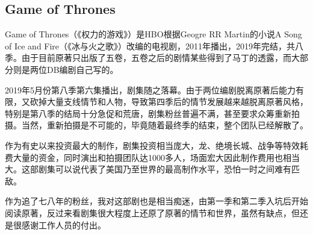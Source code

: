 \subsection{Game of Thrones}
Game of Thrones（《权力的游戏》）是HBO根据Geogre RR Martin的小说A Song of Ice and Fire（《冰与火之歌》）改编的电视剧，2011年播出，2019年完结，共八季。由于目前原著只出版了五卷，五卷之后的剧情某些得到了马丁的透露，而大部分则是两位DB编剧自己写的。

2019年5月份第八季第六集播出，剧集随之落幕。由于两位编剧脱离原著后能力有限，又砍掉大量支线情节和人物，导致第四季后的情节发展越来越脱离原著风格，特别是第八季的结局十分急促和荒唐，剧集粉丝普遍不满，甚至要求众筹重新拍摄。当然，重新拍摄是不可能的，毕竟随着最终季的结束，整个团队已经解散了。

作为有史以来投资最大的制作，剧集投资相当庞大，龙、绝境长城、战争等特效耗费大量的资金，同时演出和拍摄团队达1000多人，场面宏大因此制作费用也相当大。这部剧集可以说代表了美国乃至世界的最高制作水平，恐怕一时之间难有匹敌。

作为追了七八年的粉丝，我对这部剧也是相当痴迷，由第一季和第二季入坑后开始阅读原著，反过来看剧集很大程度上还原了原著的情节和世界，虽然有缺点，但还是很感谢工作人员的付出。